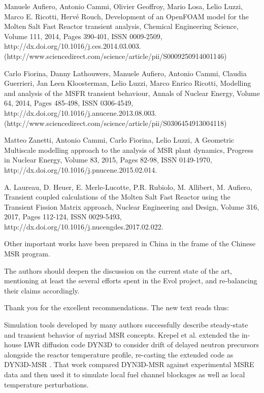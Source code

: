 \documentclass[answers,11pt]{exam}
\begin{document}
\begin{questions}
Manuele Aufiero, Antonio Cammi, Olivier Geoffroy, Mario Losa, Lelio Luzzi, Marco
E. Ricotti, Hervé Rouch, Development of an OpenFOAM model for the Molten Salt
Fast Reactor transient analysis, Chemical Engineering Science, Volume 111, 2014,
Pages 390-401, ISSN 0009-2509, http://dx.doi.org/10.1016/j.ces.2014.03.003.
(http://www.sciencedirect.com/science/article/pii/S0009250914001146)

Carlo Fiorina, Danny Lathouwers, Manuele Aufiero, Antonio Cammi, Claudia
Guerrieri, Jan Leen Kloosterman, Lelio Luzzi, Marco Enrico Ricotti, Modelling
and analysis of the MSFR transient behaviour, Annals of Nuclear Energy, Volume
64, 2014, Pages 485-498, ISSN 0306-4549,
http://dx.doi.org/10.1016/j.anucene.2013.08.003.
(http://www.sciencedirect.com/science/article/pii/S0306454913004118)

Matteo Zanetti, Antonio Cammi, Carlo Fiorina, Lelio Luzzi, A Geometric
Multiscale modelling approach to the analysis of MSR plant dynamics, Progress in
Nuclear Energy, Volume 83, 2015, Pages 82-98, ISSN 0149-1970,
http://dx.doi.org/10.1016/j.pnucene.2015.02.014.

A. Laureau, D. Heuer, E. Merle-Lucotte, P.R. Rubiolo, M. Allibert, M. Aufiero,
Transient coupled calculations of the Molten Salt Fast Reactor using the
Transient Fission Matrix approach, Nuclear Engineering and Design, Volume 316,
2017, Pages 112-124, ISSN 0029-5493,
http://dx.doi.org/10.1016/j.nucengdes.2017.02.022.

Other important works have been prepared in China in the frame of the Chinese MSR program.

The authors should deepen the discussion on the current state of the art,
mentioning at least the several efforts spent in the Evol project, and
re-balancing their claims accordingly.
\begin{solution}
        Thank you for the excellent recommendations. The new text reads thus:


        Simulation tools developed by many authors successfully describe
        steady-state and
        transient behavior of myriad MSR concepts. Krepel et al. extended
        the in-house LWR
        diffusion code DYN3D to consider drift of delayed neutron precursors
        alongside
        the reactor temperature profile, re-casting the extended code as
        DYN3D-MSR \cite{krepel_dyn3d-msr_2007}. That work compared DYN3D-MSR
        against
        experimental MSRE data and then used it to simulate local fuel
        channel
        blockages as well as local temperature perturbations.


\end{solution}
\end{questions}
\end{document}
